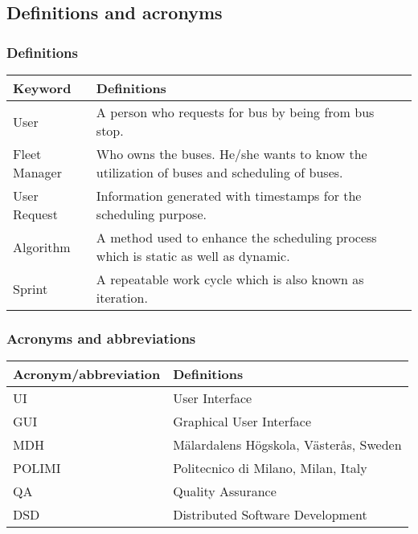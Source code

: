 \subsection{Definitions and acronyms}
\subsubsection{Definitions}
\begin{center}
	\begin{tabular} { | m{3cm} | m{10cm} | }
		\hline
		\textbf{Keyword} & \textbf{Definitions}\\
		\hline
		User & A person who requests for bus by being from bus stop.\\
		\hline
		Fleet Manager & Who owns the buses. He/she wants to know the utilization of buses and scheduling of buses.\\
		\hline
		User Request & Information generated with timestamps for the scheduling purpose.\\
		\hline
		Algorithm & A method used to enhance the scheduling process which is static as well as dynamic.\\
		\hline
		Sprint & A repeatable work cycle which is also known as iteration.\\
		\hline
	\end{tabular}
\end{center}
\subsubsection{Acronyms and abbreviations}
\begin{center}
	\begin{tabular} { | m{5cm} | m{8cm} | }
		\hline
		\textbf{Acronym/abbreviation} & \textbf{Definitions}\\
		\hline
		UI & User Interface\\
		\hline
		GUI & Graphical User Interface\\
		\hline
		MDH & Mälardalens Högskola, Västerås, Sweden\\
		\hline
		POLIMI & Politecnico di Milano, Milan, Italy\\
		\hline
		QA & Quality Assurance\\
		\hline
		DSD & Distributed Software Development\\
		\hline
	\end{tabular}
\end{center}